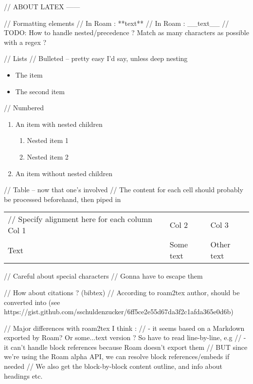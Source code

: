 // ABOUT LATEX ------

// Formatting elements
\textbf{} // In Roam : **text**
\textit{} // In Roam : __text__
// TODO: How to handle nested/precedence ? Match as many characters as possible with a regex ?

// Lists
// Bulleted -- pretty easy I'd say, unless deep nesting
\begin{itemize}
    \item The item
    \item The second item
\end{itemize}
// Numbered
\begin{enumerate}
    \item An item with nested children
    \begin{enumerate}
        \item Nested item 1
        \item Nested item 2
    \end{enumerate}
    \item An item without nested children
\end{enumerate}

// Table -- now that one's involved
// The content for each cell should probably be processed beforehand, then piped in
\begin{tabular}{ l l l } // Specify alignment here for each column
    Col 1     & Col 2     & Col 3  \\
    Text      & Some text & Other text \\
\end{tabular}

// Careful about special characters
// Gonna have to escape them

// How about citations ? (bibtex)
// According to roam2tex author, should be converted into \cite{} (see https://gist.github.com/sschuldenzucker/6ff5ce2e55d67da3f2c1afda365e0d6b)

// Major differences with roam2tex I think :
// - it seems based on a Markdown exported by Roam? Or some...text version ? So have to read line-by-line, e.g
// - it can't handle block references because Roam doesn't export them
// BUT since we're using the Roam alpha API, we can resolve block references/embeds if needed
// We also get the block-by-block content outline, and info about headings etc.
